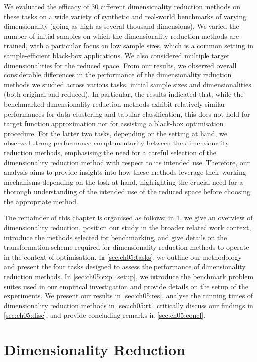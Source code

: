We evaluated the
efficacy of 30 different dimensionality reduction methods on these tasks on a wide variety of synthetic and real-world benchmarks of varying dimensionality (going as high as several thousand dimensions).
We varied the number of initial samples on which the dimensionality reduction methods are trained, with a particular focus on low sample sizes, which is a common setting in sample-efficient black-box applications.
We also considered multiple target dimensionalities for the reduced space.
From our results, we observed overall considerable differences in the performance of the dimensionality reduction methods we studied across various tasks, initial sample sizes and dimensionalities (both original and reduced).
In particular, the results indicated that, while the benchmarked dimensionality reduction methods exhibit relatively similar performances for data clustering and tabular classification, this does not hold for target function approximation nor for assisting a black-box optimisation procedure.
For the latter two tasks, depending on the setting at hand, we observed strong performance complementarity between the dimensionality reduction methods, emphasising the need for a careful selection of the dimensionality reduction method with respect to its intended use.
Therefore, our analysis aims to provide insights into how these methods leverage their working mechanisms depending on the task at hand, highlighting the crucial need for a thorough understanding of the intended use of the reduced space before choosing the appropriate method.

The remainder of this chapter is organised as follows: in \cref{sec:ch05:dim_red}, we give an overview of dimensionality reduction, position our study in the broader related work context, introduce the methods selected for benchmarking, and give details on the transformation scheme required for dimensionality reduction methods to operate in the context of optimisation.
In \cref{sec:ch05:tasks}, we outline our methodology and present the four tasks designed to assess the performance of dimensionality reduction methods.
In \cref{sec:ch05:exp_setup}, we introduce the benchmark problem suites used in our empirical investigation and provide details on the setup of the experiments.
We present our results in \cref{sec:ch05:res}, analyse the running times of dimensionality reduction methods in \cref{sec:ch05:rt}, critically discuss our findings in \cref{sec:ch05:disc}, and provide concluding remarks in \cref{sec:ch05:concl}.

\section{Dimensionality Reduction}
\label{sec:ch05:dim_red}

